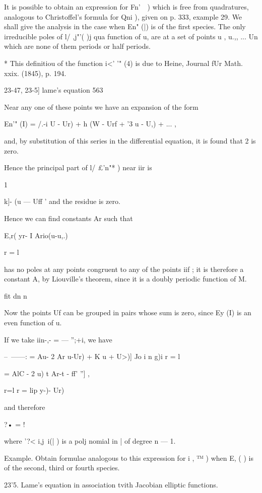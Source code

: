 {{{{{{{It is possible to obtain an expression for Fn'\ \  ) which is free from 
quadratures, analogous to Christoffel's formula for Qni ), given on p. 333, 
example 29. We shall give the analysis in the case when En"  (|) is of the 
first species. The only irreducible poles of l/  ,j"'( )j  qua function of u, are 
at a set of points u , u.,, ... Un which are none of them periods or half periods. 

* This definitiou of the function i<' '" (4) is due to Heine, Journal fUr Math. xxix. (1845), 
p. 194. 



23-47, 23-5] lame's equation 563 

Near any one of these points we have an expansion of the form 

En'" (I) = /.-i  U - Ur) + h (W - Urf +  '3  u - U,)  + ... , 

and, by substitution of this series in the differential equation, it is found that 
 2 is zero. 

Hence the principal part of l/ £'n"*   )  near iir is 

1 

k]- (u — Uff ' 
and the residue is zero. 

Hence we can find constants Ar such that 

 E,r( yr- I Ario(u-u,.) 

r = l 

has no poles at any points congruent to any of the points iif ; it is therefore 
a constant A, by Liouville's theorem, since it is a doubly periodic function 
of M. 

fit dn n 

Now the points Uf can be grouped in pairs whose sum is zero, since 
Ey  (I) is an even function of u. 

If we take iin-,- = — '';+i, we have 

--~——:  = Au- 2 Ar   u-Ur) + K u + U>)] 
Jo i n  g)i r = l 

= AlC - 2  u) t Ar-t - ff' ''] , 

r=l r = lip y-)-  Ur) 

and therefore 

?• = ! 

where '?< i,j\ i(| ) is a polj nomial in | of degree  n — 1. 

Example. Obtain formulae analogous to this expression for i , ™   ) when E,   ( ) is of 
the second, third or fourth species. 

23'5. Lame's equation in association tvith Jacobian elliptic functions. 

}}}}}}}
